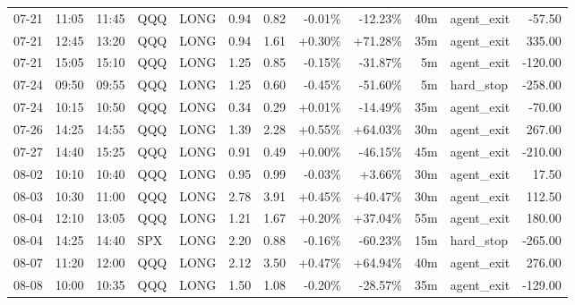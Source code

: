 \documentclass[11pt,a4paper,twoside]{article}
\begin{document}
\begin{center}
\begin{longtable}{>{\color{txtmain}}l l l l l r r r r r >{\color{txtmain}}l r}
07-21 & 11:05 & 11:45 & QQQ & LONG & 0.94 & 0.82 & \textcolor{lossred}{-0.01\%} & \textcolor{lossred}{-12.23\%} & 40m & agent\_exit & \textcolor{lossred}{-57.50} \\
07-21 & 12:45 & 13:20 & QQQ & LONG & 0.94 & 1.61 & \textcolor{wingreen}{+0.30\%} & \textcolor{wingreen}{+71.28\%} & 35m & agent\_exit & \textcolor{wingreen}{335.00} \\
07-21 & 15:05 & 15:10 & QQQ & LONG & 1.25 & 0.85 & \textcolor{lossred}{-0.15\%} & \textcolor{lossred}{-31.87\%} & 5m & agent\_exit & \textcolor{lossred}{-120.00} \\
07-24 & 09:50 & 09:55 & QQQ & LONG & 1.25 & 0.60 & \textcolor{lossred}{-0.45\%} & \textcolor{lossred}{-51.60\%} & 5m & hard\_stop & \textcolor{lossred}{-258.00} \\
07-24 & 10:15 & 10:50 & QQQ & LONG & 0.34 & 0.29 & \textcolor{wingreen}{+0.01\%} & \textcolor{lossred}{-14.49\%} & 35m & agent\_exit & \textcolor{lossred}{-70.00} \\
07-26 & 14:25 & 14:55 & QQQ & LONG & 1.39 & 2.28 & \textcolor{wingreen}{+0.55\%} & \textcolor{wingreen}{+64.03\%} & 30m & agent\_exit & \textcolor{wingreen}{267.00} \\
07-27 & 14:40 & 15:25 & QQQ & LONG & 0.91 & 0.49 & \textcolor{wingreen}{+0.00\%} & \textcolor{lossred}{-46.15\%} & 45m & agent\_exit & \textcolor{lossred}{-210.00} \\
08-02 & 10:10 & 10:40 & QQQ & LONG & 0.95 & 0.99 & \textcolor{lossred}{-0.03\%} & \textcolor{wingreen}{+3.66\%} & 30m & agent\_exit & \textcolor{wingreen}{17.50} \\
08-03 & 10:30 & 11:00 & QQQ & LONG & 2.78 & 3.91 & \textcolor{wingreen}{+0.45\%} & \textcolor{wingreen}{+40.47\%} & 30m & agent\_exit & \textcolor{wingreen}{112.50} \\
08-04 & 12:10 & 13:05 & QQQ & LONG & 1.21 & 1.67 & \textcolor{wingreen}{+0.20\%} & \textcolor{wingreen}{+37.04\%} & 55m & agent\_exit & \textcolor{wingreen}{180.00} \\
08-04 & 14:25 & 14:40 & SPX & LONG & 2.20 & 0.88 & \textcolor{lossred}{-0.16\%} & \textcolor{lossred}{-60.23\%} & 15m & hard\_stop & \textcolor{lossred}{-265.00} \\
08-07 & 11:20 & 12:00 & QQQ & LONG & 2.12 & 3.50 & \textcolor{wingreen}{+0.47\%} & \textcolor{wingreen}{+64.94\%} & 40m & agent\_exit & \textcolor{wingreen}{276.00} \\
08-08 & 10:00 & 10:35 & QQQ & LONG & 1.50 & 1.08 & \textcolor{lossred}{-0.20\%} & \textcolor{lossred}{-28.57\%} & 35m & agent\_exit & \textcolor{lossred}{-129.00} \\

\end{longtable}
\end{center}
\end{document}
